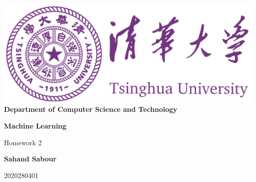 \documentclass[12pt,a4paper]{article}
\begin{document}
	\begin{titlepage}
		\begin{center}
			\includegraphics[scale=.4]{Figures/Cover}\\
			\vspace{1cm}
			\bf{ \large {Department of Computer Science and Technology} }
		\end{center}
		
		\vspace{4cm}
		\centering
		\textbf{\Huge Machine Learning}
		\vspace{.5cm}
		
		{\Large Homework 2}

		\vspace{4cm}
		
		\textbf{\LARGE Sahand Sabour}
		
		
		
		\vspace{0.5cm}
		
		{\large 2020280401}
		
		
		\vfill
		
	\end{titlepage}

	
\end{document}
